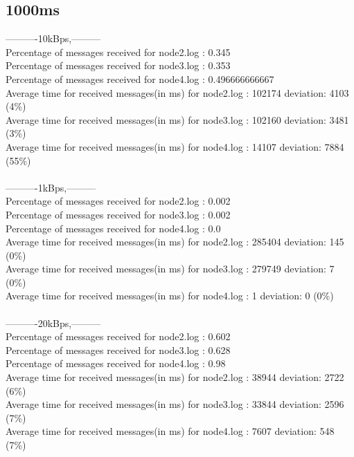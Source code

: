     \subsection{1000ms}\label{RawResults:1000ms}
        ----------10kBps,---------\\
        Percentage of messages received for node2.log : 0.345\\
        Percentage of messages received for node3.log : 0.353\\
        Percentage of messages received for node4.log : 0.496666666667\\
        Average time for received messages(in ms) for  node2.log : 102174 	deviation: 4103 (4\%)\\
        Average time for received messages(in ms) for  node3.log : 102160 	deviation: 3481 (3\%)\\
        Average time for received messages(in ms) for  node4.log : 14107 	deviation: 7884 (55\%)\\\\
        ----------1kBps,---------\\
        Percentage of messages received for node2.log : 0.002\\
        Percentage of messages received for node3.log : 0.002\\
        Percentage of messages received for node4.log : 0.0\\
        Average time for received messages(in ms) for  node2.log : 285404 	deviation: 145 (0\%)\\
        Average time for received messages(in ms) for  node3.log : 279749 	deviation: 7 (0\%)\\
        Average time for received messages(in ms) for  node4.log : 1 	deviation: 0 (0\%)\\\\
        ----------20kBps,---------\\
        Percentage of messages received for node2.log : 0.602\\
        Percentage of messages received for node3.log : 0.628\\
        Percentage of messages received for node4.log : 0.98\\
        Average time for received messages(in ms) for  node2.log : 38944 	deviation: 2722 (6\%)\\
        Average time for received messages(in ms) for  node3.log : 33844 	deviation: 2596 (7\%)\\
        Average time for received messages(in ms) for  node4.log : 7607 	deviation: 548 (7\%)\\\\
